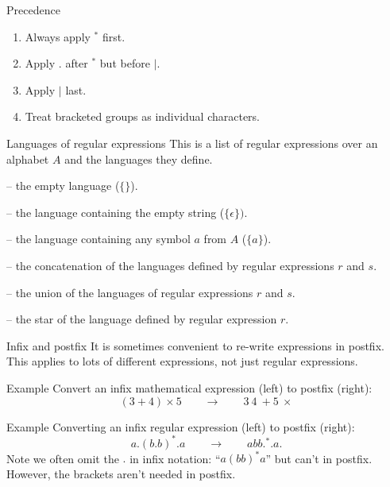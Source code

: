 \documentclass{beamer}
\begin{document}
\begin{frame}{Precedence}
  \begin{enumerate}
    \setlength\itemsep{5mm}
    \item Always apply $^*$ first.
    \item Apply $.$ after $^*$ but before $|$.
    \item Apply $|$ last.
    \item Treat bracketed groups as individual characters.
  \end{enumerate}
\end{frame}


\begin{frame}{Languages of regular expressions}
  This is a list of regular expressions over an alphabet $A$ and the languages they define.
  \begin{description}[aa]
    \setlength\itemsep{4mm}
    \item[$\emptyset$] -- the empty language ($\{\}$).
    \item[$\epsilon$] -- the language containing the empty string ($\{\epsilon\})$.
    \item[$a$] -- the language containing any symbol $a$ from $A$ ($\{a\}$).
    \item[$r.s$] -- the concatenation of the languages defined by regular expressions $r$ and $s$.
    \item[$r|s$] -- the union of the languages of regular expressions $r$ and $s$.
    \item[$r^*$] -- the star of the language defined by regular expression $r$.
  \end{description}
\end{frame}


\begin{frame}{Infix and postfix}
  It is sometimes convenient to re-write expressions in postfix.
  This applies to lots of different expressions, not just regular expressions.
  \begin{exampleblock}{Example}
    Convert an infix mathematical expression (left) to postfix (right):
    $$(3+4) \times 5 \qquad \rightarrow \qquad 3 \ 4 \  + 5 \  \times$$
  \end{exampleblock}
  \begin{exampleblock}{Example}
    Converting an infix regular expression (left) to postfix (right):
    $$a.(b.b)^*.a \qquad  \rightarrow  \qquad  abb.^*.a.$$
    Note we often omit the $.$ in infix notation: ``$a(bb)^*a$'' but can't in postfix.
    However, the brackets aren't needed in postfix.
  \end{exampleblock}
\end{frame}
\end{document}
